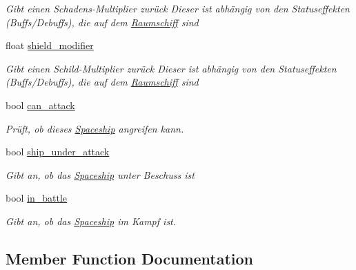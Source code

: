 \begin{DoxyCompactItemize}
\begin{DoxyCompactList}\small\item\em Gibt einen Schadens-\/\+Multiplier zurück Dieser ist abhängig von den Statuseffekten (Buffs/\+Debuffs), die auf dem \hyperlink{class_raumschiff}{Raumschiff} sind \end{DoxyCompactList}\item 
float \hyperlink{class_spaceship_a1daf5f7456d1b35b59eb6580b4ad5b9e}{shield\+\_\+modifier}
\begin{DoxyCompactList}\small\item\em Gibt einen Schild-\/\+Multiplier zurück Dieser ist abhängig von den Statuseffekten (Buffs/\+Debuffs), die auf dem \hyperlink{class_raumschiff}{Raumschiff} sind \end{DoxyCompactList}\item 
bool \hyperlink{class_spaceship_a459b3d62a7e0a7e76b7a019de5b386e1}{can\+\_\+attack}
\begin{DoxyCompactList}\small\item\em Prüft, ob dieses \hyperlink{class_spaceship}{Spaceship} angreifen kann. \end{DoxyCompactList}\item 
bool \hyperlink{class_spaceship_ae627cd6b28077cea3ca7d50e1c3eea8d}{ship\+\_\+under\+\_\+attack}
\begin{DoxyCompactList}\small\item\em Gibt an, ob das \hyperlink{class_spaceship}{Spaceship} unter Beschuss ist \end{DoxyCompactList}\item 
bool \hyperlink{class_spaceship_a008e4fcc8af1c4ebbaee64603593d6d1}{in\+\_\+battle}
\begin{DoxyCompactList}\small\item\em Gibt an, ob das \hyperlink{class_spaceship}{Spaceship} im Kampf ist. \end{DoxyCompactList}\end{DoxyCompactItemize}


\subsection{Member Function Documentation}
\mbox{\label{class_spaceship_a888beaebbb837300c645eb0bc3e979e0}} 
